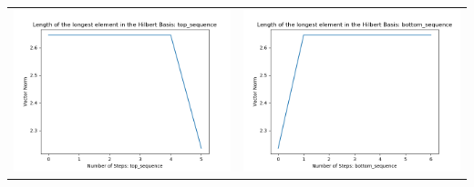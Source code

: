 \documentclass[10pt]{article}
\begin{document}
\begin{tabular}{c|c}
\begin{minipage}{.45\textwidth}
\includegraphics[width=\textwidth]{"DATA/5d/6 generators 1 bound E/top_sequence LENGTH"}
\end{minipage} &
\begin{minipage}{.45\textwidth}
\includegraphics[width=\textwidth]{"DATA/5d/6 generators 1 bound E bottomup/bottom_sequence LENGTH"}
\end{minipage}
\end{tabular}
\end{document}

